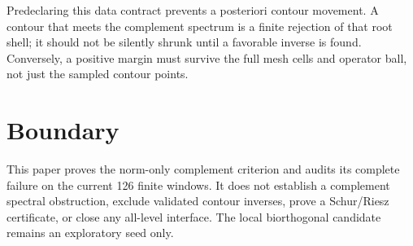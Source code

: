 \documentclass[12pt]{article}
\theoremstyle{remark}
\begin{document}
Predeclaring this data contract prevents a posteriori contour movement.  A
contour that meets the complement spectrum is a finite rejection of that
root shell; it should not be silently shrunk until a favorable inverse is
found.  Conversely, a positive margin must survive the full mesh cells and
operator ball, not just the sampled contour points.

\section{Boundary}

This paper proves the norm-only complement criterion and audits its complete
failure on the current 126 finite windows.  It does not establish a
complement spectral obstruction, exclude validated contour inverses, prove a
Schur/Riesz certificate, or close any all-level interface.  The local
biorthogonal candidate remains an exploratory seed only.



\end{document}
